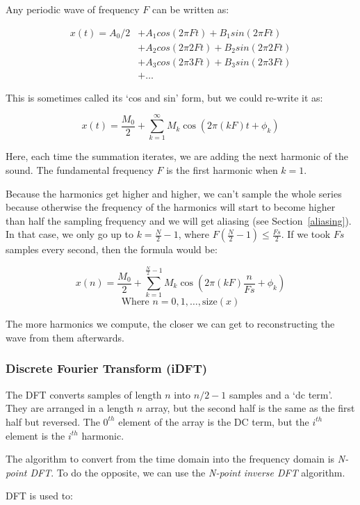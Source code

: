 Any periodic wave of frequency $F$ can be written as:

\begin{align*}
  x(t) = A_0 / 2 &+ A_1 cos(2 \pi Ft) + B_1 sin(2\pi Ft)\\
                 &+ A_2 cos(2 \pi 2Ft) + B_2 sin(2\pi 2Ft)\\
                 &+ A_3 cos(2 \pi 3Ft) + B_3 sin(2\pi 3Ft)\\
                 &+ \dots
\end{align*}

This is sometimes called its `cos and sin' form, but we could re-write it as:

\[
  x(t) = \frac{M_0}{2} + \sum\limits^\infty_{k=1}M_k\cos(2\pi (kF)t + \phi_k)
\]

Here, each time the summation iterates, we are adding the next harmonic of the
sound. The fundamental frequency $F$ is the first harmonic when $k=1$.

Because the harmonics get higher and higher, we can't sample the whole series
because otherwise the frequency of the harmonics will start to become higher
than half the sampling frequency and we will get aliasing (see
Section~\ref{aliasing}). In that case, we only go up to $k=\frac{N}{2} - 1$,
where $F(\frac{N}{2} - 1) \le \frac{Fs}{2}$. If we took $Fs$ samples every
second, then the formula would be:

\[
  x(n) = \frac{M_0}{2} + \sum\limits^{\frac{N}{2}-1}_{k=1}M_k\cos\left(2\pi (kF)\frac{n}{Fs} + \phi_k\right)
\]
\[
  \text{Where } n = 0,1,\dots,\text{size}(x)
\]

The more harmonics we compute, the closer we can get to reconstructing the wave
from them afterwards.

\subsubsection{Discrete Fourier Transform (iDFT)}

The DFT converts samples of length $n$ into $n/2 - 1$ samples and a `dc term'.
They are arranged in a length $n$ array, but the second half is the same as the
first half but reversed. The $0^{th}$ element of the array is the DC term, but
the $i^{th}$ element is the $i^{th}$ harmonic. 

The algorithm to convert from the time domain into the frequency domain is
\textit{N-point DFT}. To do the opposite, we can use the \textit{N-point inverse
DFT} algorithm.

DFT is used to:

